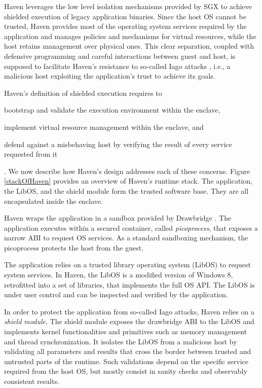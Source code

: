 Haven leverages the low level isolation mechanisms provided by SGX to achieve shielded execution of legacy application binaries.
Since the host OS cannot be trusted, Haven provides most of the operating system services required by the application and manages policies and mechanisms for virtual resources, while the host retains management over physical ones.
This clear separation, coupled with defensive programming and careful interactions between guest and host, is supposed to facilitate Haven's resistance to so-called Iago attacks \cite{DBLP:conf/asplos/CheckowayS13}, i.e., a malicious host exploiting the application's trust to achieve its goals.

Haven's definition of shielded execution requires to
\begin{enumerate*}
	\item bootstrap and validate the execution environment within the enclave,
	\item implement virtual resource management within the enclave, and
	\item defend against a misbehaving host by verifying the result of every service requested from it%
\end{enumerate*}.
We now describe how Haven's design addresses each of these concerns.
Figure \ref{stackOfHaven} provides an overview of Haven's runtime stack.
The application, the LibOS, and the shield module form the trusted software base.
They are all encapsulated inside the enclave.

Haven wraps the application in a sandbox provided by Drawbridge \cite{DBLP:conf/asplos/PorterBHOH11}.
The application executes within a secured container, called \emph{picoprocess}, that exposes a narrow ABI to request OS services.
As a standard sandboxing mechanism, the picoprocess protects the host from the guest.

The application relies on a trusted library operating system (LibOS) to request system services.
In Haven, the LibOS is a modified version of Windows 8, retrofitted into a set of libraries, that implements the full OS API.
The LibOS is under user control and can be inspected and verified by the application.

In order to protect the application from so-called Iago attacks, Haven relies on a \emph{shield module}.
The shield module exposes the drawbridge ABI to the LibOS and implements kernel functionalities and primitives such as memory management and thread synchronization.
It isolates the LibOS from a malicious host by validating all parameters and results that cross the border between trusted and untrusted parts of the runtime.
Such validations depend on the specific service required from the host OS, but mostly consist in sanity checks and observably consistent results.

